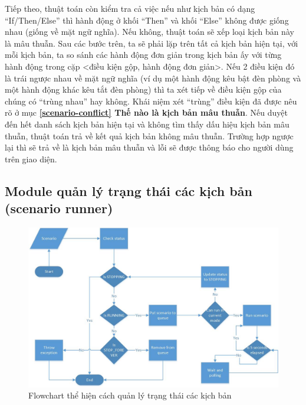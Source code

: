 \documentclass[12pt,a4paper,oneside]{extbook}
\begin{document}
Tiếp theo, thuật toán còn kiểm tra cả việc nếu như kịch bản có dạng “If/Then/Else” thì hành động ở khối “Then” và khối “Else” không được giống nhau (giống về mặt ngữ nghĩa). Nếu không, thuật toán sẽ xếp loại kịch bản này là mâu thuẫn. Sau các bước trên, ta sẽ phải lặp trên tất cả kịch bản hiện tại, với mỗi kịch bản, ta so sánh các hành động đơn giản trong kịch bản ấy với từng hành động trong cặp <điều kiện gộp, hành động đơn giản>. Nếu 2 điều kiện đó là trái ngược nhau về mặt ngữ nghĩa (ví dụ một hành động kêu bật đèn phòng và một hành động khác kêu tắt đèn phòng) thì ta xét tiếp về điều kiện gộp của chúng có “trùng nhau” hay không. Khái niệm xét “trùng” điều kiện đã được nêu rõ ở mục \textbf{\ref{scenario-conflict} Thế nào là kịch bản mâu thuẫn}. Nếu duyệt đến hết danh sách kịch bản hiện tại và không tìm thấy dấu hiệu kịch bản mâu thuẫn, thuật toán trả về kết quả kịch bản không mâu thuẫn. Trường hợp ngược lại thì sẽ trả về là kịch bản mâu thuẫn và lỗi sẽ được thông báo cho người dùng trên giao diện. 

\subsection{Module quản lý trạng thái các kịch bản (scenario runner)}

\begin{figure}[h]
  \centering
     \includegraphics[width=15cm]{6-Flowchart-Scenario-Runner}
  \caption{Flowchart thể hiện cách quản lý trạng thái các kịch bản}\label{fig:6-Flowchart-Scenario-Runner}
\end{figure}
\end{document}
